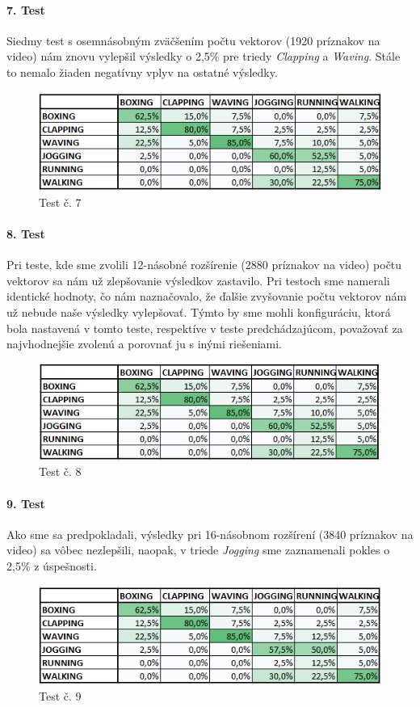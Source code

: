 \paragraph{7. Test} 
Siedmy test s osemnásobným zväčšením počtu vektorov (1920 príznakov na video) nám znovu vylepšil výsledky o 2,5\% pre triedy \textit{Clapping} a \textit{Waving}. Stále to nemalo žiaden negatívny vplyv na ostatné výsledky.
\begin{figure}[H]
  \centering
  \includegraphics[width=14cm]{img/test6PCA8g.png}
  \caption{Test č. 7}
  \label{test7}
\end{figure} 

\paragraph{8. Test}
Pri teste, kde sme zvolili 12-násobné rozšírenie (2880 príznakov na video) počtu vektorov sa nám už zlepšovanie výsledkov zastavilo. Pri testoch sme namerali identické hodnoty, čo nám naznačovalo, že ďalšie zvyšovanie počtu vektorov nám už nebude naše výsledky vylepšovať. Týmto by sme mohli konfiguráciu, ktorá bola nastavená v tomto teste, respektíve v teste predchádzajúcom, považovať za najvhodnejšie zvolenú a porovnať ju s inými riešeniami.
\begin{figure}[H]
  \centering
  \includegraphics[width=14cm]{img/test6PCA12g.png}
  \caption{Test č. 8}
  \label{test8}
\end{figure}  

\paragraph{9. Test} 
Ako sme sa predpokladali, výsledky pri 16-násobnom rozšírení (3840 príznakov na video) sa vôbec nezlepšili, naopak, v triede \textit{Jogging} sme zaznamenali pokles o 2,5\% z úspešnosti. 
\begin{figure}[H]
  \centering
  \includegraphics[width=14cm]{img/test6PCA16g.png}
  \caption{Test č. 9}
  \label{test9}
\end{figure} 

